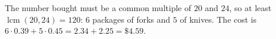 The number bought must be a common multiple of $20$ and $24$, so at least $\operatorname{lcm}(20,24)=120$: $6$ packages of forks and $5$ of knives. The cost is $6\cdot0.39+5\cdot0.45=2.34+2.25=\boxed{\$4.59}$.
